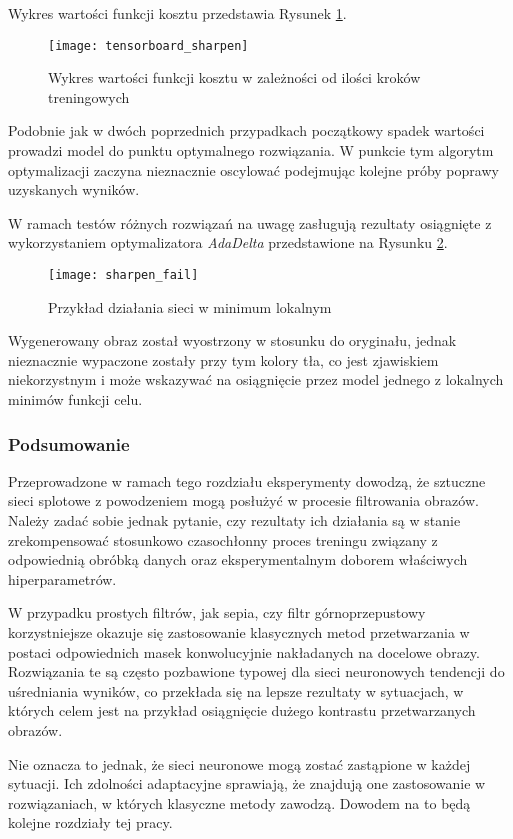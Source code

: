     Wykres wartości funkcji kosztu przedstawia Rysunek \ref{fig:tensorboard_sharpen}.

    \begin{figure}[H]
      \centering
      \texttt{[image: tensorboard\_sharpen]}
      \caption[Wykres wartości funkcji kosztu w zależności od ilości kroków treningowych - źródło: Praca własna]{Wykres wartości funkcji kosztu w zależności od ilości kroków treningowych}
      \label{fig:tensorboard_sharpen}
    \end{figure}

    Podobnie jak w dwóch poprzednich przypadkach początkowy spadek wartości
    prowadzi model do punktu optymalnego rozwiązania. W punkcie tym algorytm optymalizacji
    zaczyna nieznacznie oscylować podejmując kolejne próby poprawy uzyskanych wyników.

    W ramach testów różnych rozwiązań na uwagę zasługują rezultaty osiągnięte
    z wykorzystaniem optymalizatora \textit{AdaDelta} przedstawione na Rysunku \ref{fig:sharpen_fail}.

    \begin{figure}[H]
      \centering
      \texttt{[image: sharpen\_fail]}
      \caption[Przykład działania sieci w minimum lokalnym - źródło: Praca własna]{Przykład działania sieci w minimum lokalnym}
      \label{fig:sharpen_fail}
    \end{figure}

    Wygenerowany obraz został wyostrzony w stosunku do oryginału, jednak
    nieznacznie wypaczone zostały przy tym kolory tła, co jest zjawiskiem niekorzystnym i
    może wskazywać na osiągnięcie przez model jednego z lokalnych minimów funkcji celu.

  \subsubsection{Podsumowanie}

    Przeprowadzone w ramach tego rozdziału eksperymenty dowodzą, że sztuczne
    sieci splotowe z powodzeniem mogą posłużyć w procesie filtrowania obrazów.
    Należy zadać sobie jednak pytanie, czy rezultaty ich działania są w stanie
    zrekompensować stosunkowo czasochłonny proces treningu związany z odpowiednią
    obróbką danych oraz eksperymentalnym doborem właściwych hiperparametrów.

    W przypadku prostych filtrów, jak sepia, czy filtr górnoprzepustowy korzystniejsze
    okazuje się zastosowanie klasycznych metod przetwarzania w postaci
    odpowiednich masek konwolucyjnie nakładanych na docelowe obrazy. Rozwiązania te
    są często pozbawione typowej dla sieci neuronowych tendencji do uśredniania
    wyników, co przekłada się na lepsze rezultaty w sytuacjach, w których celem jest
    na przykład osiągnięcie dużego kontrastu przetwarzanych obrazów.

    Nie oznacza to jednak, że sieci neuronowe mogą zostać zastąpione w każdej sytuacji.
    Ich zdolności adaptacyjne sprawiają, że znajdują one zastosowanie w rozwiązaniach, w
    których klasyczne metody zawodzą. Dowodem na to będą kolejne rozdziały tej pracy.
